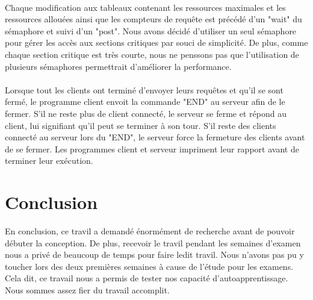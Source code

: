 \documentclass{article}
\begin{document}
\paragraph{}
Chaque modification aux tableaux contenant les ressources maximales et les ressources allouées 
ainsi que les compteurs de requête est précédé d'un "wait" du sémaphore et suivi d'un "post". 
Nous avons décidé d'utiliser un seul sémaphore pour gérer les accès aux sections critiques par 
souci de simplicité. De plus, comme chaque section critique est très courte, nous ne penssons 
pas que l'utilisation de plusieurs sémaphores permettrait d'améliorer la performance.

\paragraph{}
Lorsque tout les clients ont terminé d'envoyer leurs requêtes et qu'il se sont fermé, le programme 
client envoit la commande "END" au serveur afin de le fermer. S'il ne reste plus de client connecté, 
le serveur se ferme et répond au client, lui signifiant qu'il peut se terminer à son tour. S'il reste 
des clients connecté au serveur lors du "END", le serveur force la fermeture des clients avant de se 
fermer. Les programmes client et serveur impriment leur rapport avant de terminer leur exécution.


\section{Conclusion}
En conclusion, ce travil a demandé énormément de recherche avant de pouvoir débuter la conception. 
De plus, recevoir le travil pendant les semaines d'examen nous a privé de beaucoup de temps pour 
faire ledit travil. Nous n'avons pas pu y toucher lors des deux premières semaines à cause de l'étude 
pour les examens. Cela dit, ce travail nous a permis de tester nos capacité d'autoapprentissage. 
Nous sommes assez fier du travail accomplit.
\end{document}
